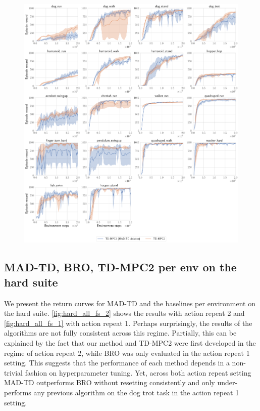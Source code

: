 \begin{figure}[H]
    \centering
    \includegraphics[width=\linewidth]{figures/mad-td/ablation.pdf}
    \caption{}
    \label{fig:tdmpc_ablation}
\end{figure}

\newpage

\subsection{MAD-TD, BRO, TD-MPC2 per env on the hard suite}
\label{app:results_base}

We present the return curves for MAD-TD and the baselines per environment on the hard suite.
\autoref{fig:hard_all_fs_2} shows the results with action repeat 2 and \autoref{fig:hard_all_fs_1} with action repeat 1. 
Perhaps surprisingly, the results of the algorithms are not fully consistent across this regime. 
Partially, this can be explained by the fact that our method and TD-MPC2 were first developed in the regime of action repeat 2, while BRO was only evaluated in the action repeat 1 setting.
This suggests that the performance of each method depends in a non-trivial fashion on hyperparameter tuning.
Yet, across both action repeat setting MAD-TD outperforms BRO without resetting consistently and only under-performs any previous algorithm on the dog trot task in the action repeat 1 setting.

